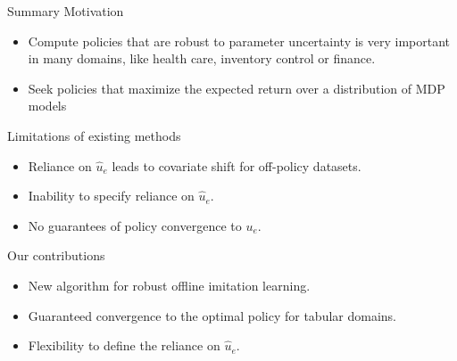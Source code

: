 \begin{block}{Summary}
\alert{Motivation}
\begin{itemize}
     \item Compute policies that are robust to parameter uncertainty is
     very important in many domains, like health care, inventory control or finance.
    \item Seek policies that maximize the expected return over a distribution of MDP models 
     \end{itemize}
\alert{Limitations of existing  methods}
\begin{itemize}
    \item Reliance on $\hat{u}_e$ leads to covariate shift for off-policy datasets.
    \item Inability to specify reliance on $\hat{u}_e$.
    \item No guarantees of policy convergence to $u_e$.
\end{itemize}
\alert{Our contributions}
\begin{itemize}
     \item New algorithm for robust offline imitation learning.
     \item Guaranteed convergence to the optimal policy for tabular domains.
     \item Flexibility to define the reliance on $\hat{u}_e$.
\end{itemize}
\end{block}
